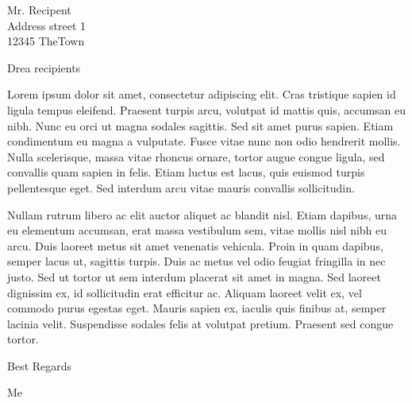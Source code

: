 \documentclass[
	fontsize=12pt,
	parskip=full,
	paper=A4,
	fromalign=right,
	fromphone=false,
	foldmarks=true,
	version=last,
]{scrlttr2}
\begin{document}
\begin{letter}{
	Mr. Recipent\\
	Address street 1\\
	12345 TheTown
}

\opening{Drea recipients}

Lorem ipsum dolor sit amet, consectetur adipiscing elit. Cras tristique sapien id ligula tempus eleifend. Praesent turpis arcu, volutpat id mattis quis, accumsan eu nibh. Nunc eu orci ut magna sodales sagittis. Sed sit amet purus sapien. Etiam condimentum eu magna a vulputate. Fusce vitae nunc non odio hendrerit mollis. Nulla scelerisque, massa vitae rhoncus ornare, tortor augue congue ligula, sed convallis quam sapien in felis. Etiam luctus est lacus, quis euismod turpis pellentesque eget. Sed interdum arcu vitae mauris convallis sollicitudin.

Nullam rutrum libero ac elit auctor aliquet ac blandit nisl. Etiam dapibus, urna eu elementum accumsan, erat massa vestibulum sem, vitae mollis nisl nibh eu arcu. Duis laoreet metus sit amet venenatis vehicula. Proin in quam dapibus, semper lacus ut, sagittis turpis. Duis ac metus vel odio feugiat fringilla in nec justo. Sed ut tortor ut sem interdum placerat sit amet in magna. Sed laoreet dignissim ex, id sollicitudin erat efficitur ac. Aliquam laoreet velit ex, vel commodo purus egestas eget. Mauris sapien ex, iaculis quis finibus at, semper lacinia velit. Suspendisse sodales felis at volutpat pretium. Praesent sed congue tortor.


\closing{Best Regards}
Me




\end{letter}

%
\end{document}
